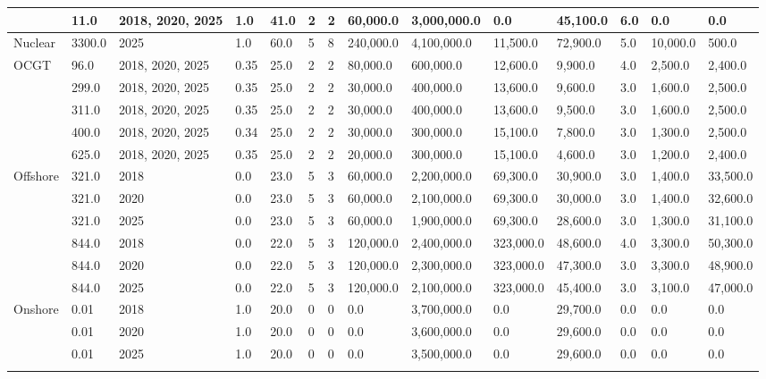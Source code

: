 \begin{table*}[]
\begin{tabularx}{\linewidth}{|p{}|l|l|l|l|l|l|l|l|l|l|l|l|l|}
& 11.0 & 2018, 2020, 2025 & 1.0 & 41.0 & 2 & 2 & 60,000.0 & 3,000,000.0 & 0.0 & 45,100.0 & 6.0 & 0.0 & 0.0 \\ \hline
Nuclear & 3300.0 & 2025 & 1.0 & 60.0 & 5 & 8 & 240,000.0 & 4,100,000.0 & 11,500.0 & 72,900.0 & 5.0 & 10,000.0 & 500.0 \\ \hline
\multirow{5}{*}{OCGT} & 96.0 & 2018, 2020, 2025 & 0.35 & 25.0 & 2 & 2 & 80,000.0 & 600,000.0 & 12,600.0 & 9,900.0 & 4.0 & 2,500.0 & 2,400.0 \\ \cline{2-14} 
& 299.0 & 2018, 2020, 2025 & 0.35 & 25.0 & 2 & 2 & 30,000.0 & 400,000.0 & 13,600.0 & 9,600.0 & 3.0 & 1,600.0 & 2,500.0 \\ \cline{2-14} 
& 311.0 & 2018, 2020, 2025 & 0.35 & 25.0 & 2 & 2 & 30,000.0 & 400,000.0 & 13,600.0 & 9,500.0 & 3.0 & 1,600.0 & 2,500.0 \\ \cline{2-14} 
& 400.0 & 2018, 2020, 2025 & 0.34 & 25.0 & 2 & 2 & 30,000.0 & 300,000.0 & 15,100.0 & 7,800.0 & 3.0 & 1,300.0 & 2,500.0 \\ \cline{2-14} 
& 625.0 & 2018, 2020, 2025 & 0.35 & 25.0 & 2 & 2 & 20,000.0 & 300,000.0 & 15,100.0 & 4,600.0 & 3.0 & 1,200.0 & 2,400.0 \\ \hline
\multirow{6}{*}{Offshore} & 321.0 & 2018 & 0.0 & 23.0 & 5 & 3 & 60,000.0 & 2,200,000.0 & 69,300.0 & 30,900.0 & 3.0 & 1,400.0 & 33,500.0 \\ \cline{2-14} 
& 321.0 & 2020 & 0.0 & 23.0 & 5 & 3 & 60,000.0 & 2,100,000.0 & 69,300.0 & 30,000.0 & 3.0 & 1,400.0 & 32,600.0 \\ \cline{2-14} 
& 321.0 & 2025 & 0.0 & 23.0 & 5 & 3 & 60,000.0 & 1,900,000.0 & 69,300.0 & 28,600.0 & 3.0 & 1,300.0 & 31,100.0 \\ \cline{2-14} 
& 844.0 & 2018 & 0.0 & 22.0 & 5 & 3 & 120,000.0 & 2,400,000.0 & 323,000.0 & 48,600.0 & 4.0 & 3,300.0 & 50,300.0 \\ \cline{2-14} 
& 844.0 & 2020 & 0.0 & 22.0 & 5 & 3 & 120,000.0 & 2,300,000.0 & 323,000.0 & 47,300.0 & 3.0 & 3,300.0 & 48,900.0 \\ \cline{2-14} 
& 844.0 & 2025 & 0.0 & 22.0 & 5 & 3 & 120,000.0 & 2,100,000.0 & 323,000.0 & 45,400.0 & 3.0 & 3,100.0 & 47,000.0 \\ \hline
\multirow{9}{*}{Onshore} & 0.01 & 2018 & 1.0 & 20.0 & 0 & 0 & 0.0 & 3,700,000.0 & 0.0 & 29,700.0 & 0.0 & 0.0 & 0.0 \\ \cline{2-14} 
& 0.01 & 2020 & 1.0 & 20.0 & 0 & 0 & 0.0 & 3,600,000.0 & 0.0 & 29,600.0 & 0.0 & 0.0 & 0.0 \\ \cline{2-14} 
& 0.01 & 2025 & 1.0 & 20.0 & 0 & 0 & 0.0 & 3,500,000.0 & 0.0 & 29,600.0 & 0.0 & 0.0 & 0.0 \\ \cline{2-14} 

\end{tabularx}
\end{table*}
